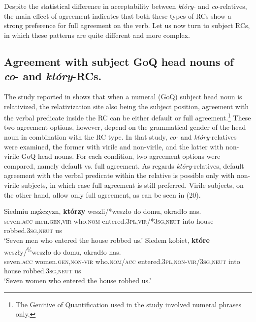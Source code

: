 \documentclass[output=paper]{langsci/langscibook}
\begin{document}
Despite the statistical difference in acceptability between \textit{który}{}- and \textit{co}{}-relatives, the main effect of agreement indicates that both these types of RCs show a strong preference for full agreement on the verb. Let us now turn to subject RCs, in which these patterns are quite different and more complex. 
 
\subsection{Agreement with subject GoQ head nouns of \textit{co}{}- and \textit{który}{}-RCs.}%
The study reported in \citet{Łęska2016} shows that when a numeral (GoQ) subject head noun is relativized, the relativization site also being the subject position, agreement with the verbal predicate inside the RC can be either default or full agreement.\footnote{The Genitive of Quantification used in the study involved numeral phrases only.} These two agreement options, however, depend on the grammatical gender of the head noun in combination with the RC type. In that study, \textit{co-} and \textit{który}{}-relatives were examined, the former with virile and non-virile, and the latter with non-virile GoQ head nouns. For each condition, two agreement options were compared, namely default vs. full agreement. As regards \textit{który}{}-relatives, default agreement with the verbal predicate within the relative is possible only with non-virile subjects, in which case full agreement is still preferred. Virile subjects, on the other hand, allow only full agreement, as can be seen in (20).

\ea%
    \label{ex:leska:20}
    \ea
    \gll Siedmiu   mężczyzn,  \textbf{którzy}   weszli/*weszło  do   domu,   okradło     nas.        \\
          seven.\textsc{acc}   men.\textsc{gen,vir}   who.\textsc{nom}  entered.\textsc{3pl,vir/*3sg,neut}       into  house     robbed.\textsc{3sg,neut}   us   \\
    \glt ‘Seven men who entered the house robbed us.’
    \ex
    \gll  Siedem   kobiet,     \textbf{które}   weszły/\textsuperscript{\%}weszło       do   domu,   okradło     nas.  \\
           seven.\textsc{acc}   women.\textsc{gen,non-vir} who.\textsc{nom/acc}  entered.\textsc{3pl,non-vir}/\textsc{3sg,neut}  into   house     robbed.\textsc{3sg,neut}   us\\
    \glt  ‘Seven women who entered the house robbed us.’
    \z
\z    
\end{document}
